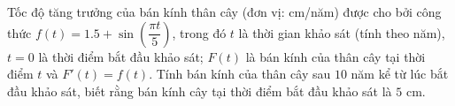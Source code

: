\begin{vd}%
	Tốc độ tăng trưởng của bán kính thân cây (đơn vị: cm/năm) được cho bởi công thức $f(t)=1.5+\sin\left(\dfrac{\pi t}{5}\right)$, trong đó $t$ là thời gian khảo sát (tính theo năm), $t=0$ là thời điểm bắt đầu khảo sát; $F(t)$ là bán kính của thân cây tại thời điểm $t$ và $F'(t)=f(t)$. Tính bán kính của thân cây sau $10$ năm kể từ lúc bắt đầu khảo sát, biết rằng bán kính cây tại thời điểm bắt đầu khảo sát là $5$ cm.
\end{vd}
